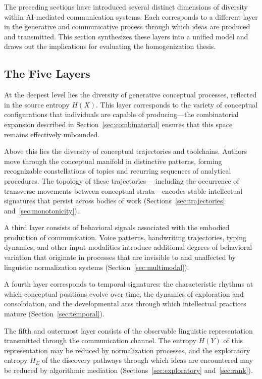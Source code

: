 \documentclass[12pt,a4paper]{article}
\theoremstyle{definition}
\theoremstyle{plain}
\theoremstyle{remark}
\newcommand{\HE}{H_{E}}
\begin{document}
The preceding sections have introduced several distinct dimensions of diversity within
AI-mediated communication systems. Each corresponds to a different layer in the generative
and communicative process through which ideas are produced and transmitted. This section
synthesizes these layers into a unified model and draws out the implications for evaluating
the homogenization thesis.

\subsection{The Five Layers}

At the deepest level lies the diversity of generative conceptual processes, reflected in the
source entropy $H(X)$. This layer corresponds to the variety of conceptual configurations
that individuals are capable of producing---the combinatorial expansion described in
Section~\ref{sec:combinatorial} ensures that this space remains effectively unbounded.

Above this lies the diversity of conceptual trajectories and toolchains. Authors move through
the conceptual manifold in distinctive patterns, forming recognizable constellations of topics
and recurring sequences of analytical procedures. The topology of these trajectories---
including the occurrence of transverse movements between conceptual strata---encodes stable
intellectual signatures that persist across bodies of work (Sections~\ref{sec:trajectories}
and~\ref{sec:monotonicity}).

A third layer consists of behavioral signals associated with the embodied production of
communication. Voice patterns, handwriting trajectories, typing dynamics, and other input
modalities introduce additional degrees of behavioral variation that originate in processes
that are invisible to and unaffected by linguistic normalization systems
(Section~\ref{sec:multimodal}).

A fourth layer corresponds to temporal signatures: the characteristic rhythms at which
conceptual positions evolve over time, the dynamics of exploration and consolidation, and
the developmental arcs through which intellectual practices mature
(Section~\ref{sec:temporal}).

The fifth and outermost layer consists of the observable linguistic representation transmitted
through the communication channel. The entropy $H(Y)$ of this representation may be reduced
by normalization processes, and the exploratory entropy $\HE$ of the discovery pathways
through which ideas are encountered may be reduced by algorithmic mediation
(Sections~\ref{sec:exploratory} and~\ref{sec:rank}).
\end{document}
